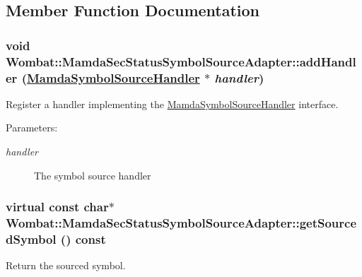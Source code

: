 \subsection{Member Function Documentation}
\hypertarget{classWombat_1_1MamdaSecStatusSymbolSourceAdapter_85be28217f8f4eb344b96f460d085c06}{
\subsubsection[addHandler]{\setlength{\rightskip}{0pt plus 5cm}void Wombat::Mamda\-Sec\-Status\-Symbol\-Source\-Adapter::add\-Handler (\hyperlink{classWombat_1_1MamdaSymbolSourceHandler}{Mamda\-Symbol\-Source\-Handler} $\ast$ {\em handler})}}
\label{classWombat_1_1MamdaSecStatusSymbolSourceAdapter_85be28217f8f4eb344b96f460d085c06}


Register a handler implementing the \hyperlink{classWombat_1_1MamdaSymbolSourceHandler}{Mamda\-Symbol\-Source\-Handler} interface. 

\begin{Desc}
\item[Parameters:]
\begin{description}
\item[{\em handler}]The symbol source handler \end{description}
\end{Desc}
\hypertarget{classWombat_1_1MamdaSecStatusSymbolSourceAdapter_1d8ac176b7946080fc1d7f665e5a19ed}{
\subsubsection[getSourcedSymbol]{\setlength{\rightskip}{0pt plus 5cm}virtual const char$\ast$ Wombat::Mamda\-Sec\-Status\-Symbol\-Source\-Adapter::get\-Sourced\-Symbol () const}}
\label{classWombat_1_1MamdaSecStatusSymbolSourceAdapter_1d8ac176b7946080fc1d7f665e5a19ed}


Return the sourced symbol. 


